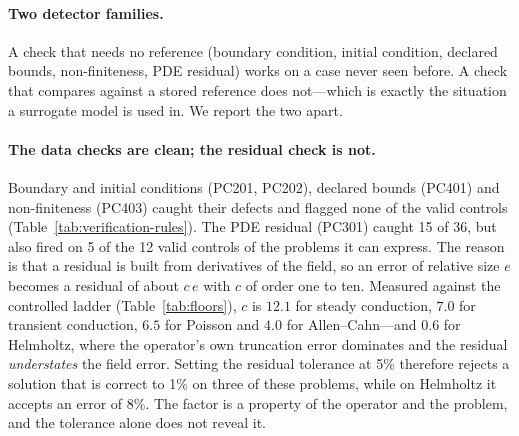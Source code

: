 \documentclass[11pt]{article}
\newcommand{\fit}[1]{\resizebox{\ifdim\width>\linewidth\linewidth\else\width\fi}{!}{#1}}
\begin{document}
\paragraph{Two detector families.} A check that needs no reference (boundary condition, initial
condition, declared bounds, non-finiteness, PDE residual) works on a case never seen before. A check
that compares against a stored reference does not---which is exactly the situation a surrogate model
is used in. We report the two apart.

\begin{table}[t]
\centering\small
\fit{}
\caption{Detector behaviour over the 72-case corpus. ``caught'' counts the 36 single-defect
predictions on which the rule fired; ``valid flagged'' counts the valid controls, split by whether
the problem's governing equation can be declared to the checker exactly. A check that fires on a
valid prediction of a problem the tool cannot express is a failure of the \emph{declaration}, and is
reported separately.}
\label{tab:verification-rules}
\end{table}

{\footnotesize\setlength{\tabcolsep}{4pt}
}

\paragraph{The data checks are clean; the residual check is not.} Boundary and initial conditions
(PC201, PC202), declared bounds (PC401) and non-finiteness (PC403) caught their defects and flagged
none of the valid controls (Table~\ref{tab:verification-rules}). The PDE residual (PC301) caught 15
of 36, but also fired on 5 of the 12 valid controls of the problems it can express. The reason is
that a residual is built from derivatives of the field, so an error of relative size $e$ becomes a
residual of about $c\,e$ with $c$ of order one to ten. Measured against the controlled ladder
(Table~\ref{tab:floors}), $c$ is $12.1$ for steady conduction, $7.0$ for transient conduction, $6.5$
for Poisson and $4.0$ for Allen--Cahn---and $0.6$ for Helmholtz, where the operator's own truncation
error dominates and the residual \emph{understates} the field error. Setting the residual tolerance at
5\% therefore rejects a solution that is correct to 1\% on three of these problems, while on
Helmholtz it accepts an error of 8\%. The factor is a property of the operator and the problem, and
the tolerance alone does not reveal it.
\end{document}
